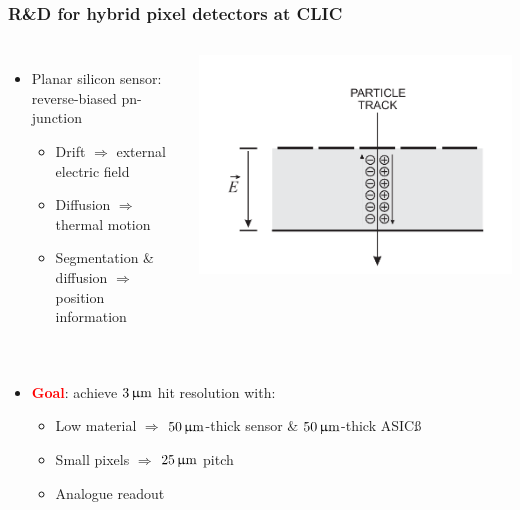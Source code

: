\begin{frame}
  \frametitle{R\&D for hybrid pixel detectors at CLIC}


  \begin{columns}
    \begin{itemize}
    \item Planar silicon sensor: reverse-biased pn-junction
      \begin{itemize}
      \item Drift $\Rightarrow$ external electric field
      \item Diffusion $\Rightarrow$ thermal motion
      \item Segmentation \& diffusion $\Rightarrow$ position
        information
      \end{itemize}
    \end{itemize}
    \centering

    \includegraphics[width=\textwidth]{figures/drift_sensor.pdf}
  \end{columns}

  \vspace{-0.5cm}

  \begin{columns}
    \begin{itemize}
    \item \textcolor{Red}{\textbf{Goal}}: achieve $3\,\upmu\mathrm{m}$ hit resolution with:
      \begin{itemize}
      \item Low material $\Rightarrow$ $50\,\upmu\mathrm{m}$-thick sensor \& $50\,\upmu\mathrm{m}$-thick ASICß
      \item Small pixels $\Rightarrow$ $25\,\upmu\mathrm{m}$ pitch
      \item Analogue readout
      \end{itemize}
    \end{itemize}


\end{columns}
\end{frame}
